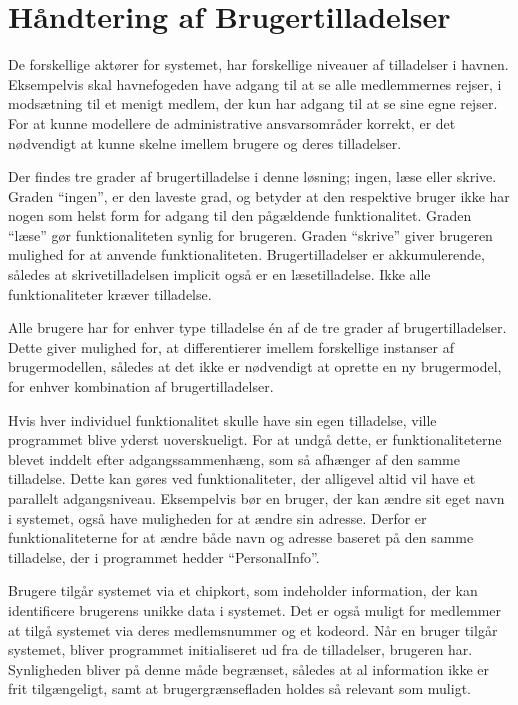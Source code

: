 \section{Håndtering af Brugertilladelser} %
\label{tilladelser}

De forskellige aktører for systemet, har forskellige niveauer af tilladelser i havnen. Eksempelvis skal havnefogeden have adgang til at se alle medlemmernes rejser, i modsætning til et menigt medlem, der kun har adgang til at se sine egne rejser. For at kunne modellere de administrative ansvarsområder korrekt, er det nødvendigt at kunne skelne imellem brugere og deres tilladelser.

Der findes tre grader af brugertilladelse i denne løsning; ingen, læse eller skrive. Graden \enquote{ingen}, er den laveste grad, og betyder at den respektive bruger ikke har nogen som helst form for adgang til den pågældende funktionalitet. Graden \enquote{læse} gør funktionaliteten synlig for brugeren. Graden \enquote{skrive} giver brugeren mulighed for at anvende funktionaliteten. Brugertilladelser er akkumulerende, således at skrivetilladelsen implicit også er en læsetilladelse. Ikke alle funktionaliteter kræver tilladelse.

Alle brugere har for enhver type tilladelse én af de tre grader af brugertilladelser. Dette giver mulighed for, at differentierer imellem forskellige instanser af brugermodellen, således at det ikke er nødvendigt at oprette en ny brugermodel, for enhver kombination af brugertilladelser.

Hvis hver individuel funktionalitet skulle have sin egen tilladelse, ville programmet blive yderst uoverskueligt. For at undgå dette, er funktionaliteterne blevet inddelt efter adgangssammenhæng, som så afhænger af den samme tilladelse. Dette kan gøres ved funktionaliteter, der alligevel altid vil have et parallelt adgangsniveau. Eksempelvis bør en bruger, der kan ændre sit eget navn i systemet, også have muligheden for at ændre sin adresse. Derfor er funktionaliteterne for at ændre både navn og adresse baseret på den samme tilladelse, der i programmet hedder \enquote{PersonalInfo}.

Brugere tilgår systemet via et chipkort, som indeholder information, der kan identificere brugerens unikke data i systemet. Det er også muligt for medlemmer at tilgå systemet via deres medlemsnummer og et kodeord. Når en bruger tilgår systemet, bliver programmet initialiseret ud fra de tilladelser, brugeren har. Synligheden bliver på denne måde begrænset, således at al information ikke er frit tilgængeligt, samt at brugergrænsefladen holdes så relevant som muligt.
